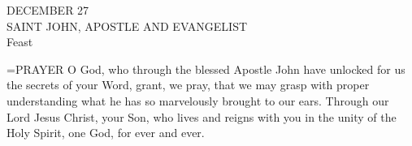 \begin{center}\normalsize DECEMBER 27\\
\footnotesize SAINT JOHN, APOSTLE AND EVANGELIST\\
\footnotesize Feast\\
\end{center}

\hangindent=\parindent \small{PRAYER 
O God, who through the blessed Apostle John
have unlocked for us the secrets of your Word,
grant, we pray,
that we may grasp with proper understanding
what he has so marvelously brought to our ears.
Through our Lord Jesus Christ, your Son,
who lives and reigns with you in the unity of the Holy Spirit,
one God, for ever and ever.\\}
 
